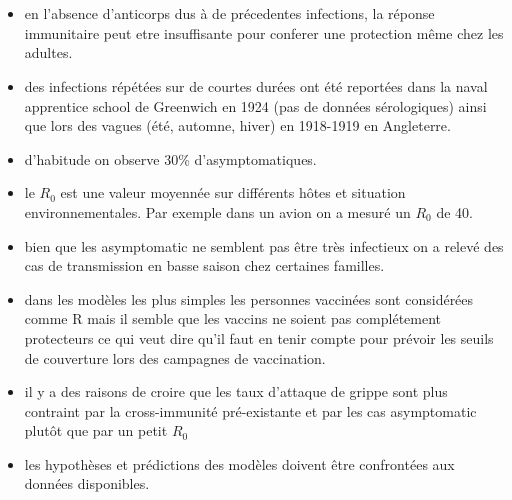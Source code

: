 \documentclass{article}
\begin{document}
\section{\citet{McVernon2007}}
\begin{itemize}
\item en l'absence d'anticorps dus à de précedentes infections, la réponse immunitaire peut etre insuffisante pour conferer une protection même chez les adultes.
\item des infections répétées sur de courtes durées ont été reportées dans la naval apprentice school de Greenwich en 1924 (pas de données sérologiques) ainsi que lors des vagues (été, automne, hiver) en 1918-1919 en Angleterre.
\item d'habitude on observe 30\% d'asymptomatiques.
\item le $R_{0}$ est une valeur moyennée sur différents hôtes et situation environnementales. Par exemple dans un avion on a mesuré un $R_{0}$ de 40.
\item bien que les asymptomatic ne semblent pas être très infectieux on a relevé des cas de transmission en basse saison chez certaines familles.
\item dans les modèles les plus simples les personnes vaccinées sont considérées comme R mais il semble que les vaccins ne soient pas complétement protecteurs ce qui veut dire qu'il faut en tenir compte pour prévoir les seuils de couverture lors des campagnes de vaccination.
\item il y a des raisons de croire que les taux d'attaque de grippe sont plus contraint par la cross-immunité pré-existante et par les cas asymptomatic plutôt que par un petit $R_{0}$
\item les hypothèses et prédictions des modèles doivent être confrontées aux données disponibles.
\end{itemize}
\end{document}
